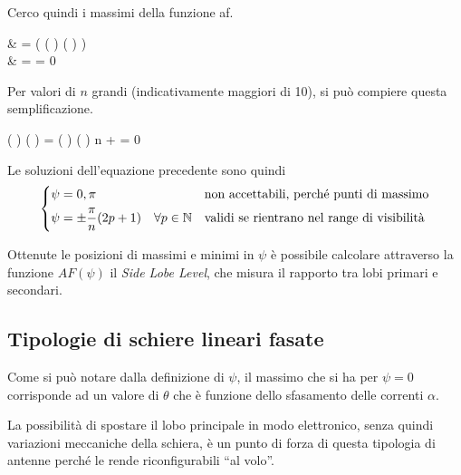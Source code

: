 			Cerco quindi i massimi della funzione \gls{af}.
			
			\begin{esp}
				& = \deriv{}{\psi} \left(
						\frac
							{ \sin(\frac{n}{2} \psi) }
							{ \sin( \frac{\psi}{2} ) }
					\right) \\
				& = \frac{1}{\sin^2 \frac{\psi}{2}} \left[
					\cos \left( \psi \right) \frac{n}{2} \sin\left(  \right) 
					- \sin \left(\frac{n}{2} \psi \right) \cos\left( \frac{\psi}{2} \right)
					\right]
				 = 0
			\end{esp} 
			
			Per valori di $n$ grandi (indicativamente maggiori di 10), si può compiere questa semplificazione.
			
			\begin{esp}
				\cos \left( \psi \right) \sin\left( \frac{\psi}{2} \right)
				=  \sin \left( \psi \right) \cos\left( \frac{\psi}{2} \right)
				 \quad \forall n \to +\infty
				 = 0
			\end{esp} 
			
			Le soluzioni dell'equazione precedente sono quindi
			\begin{equation*}
				\begin{dcases}
					\psi = 0, \pi 
						& \text{non accettabili, perché punti di massimo} \\
					\psi = \pm \frac{\pi}{n} (2p + 1) \quad \forall p \in \mathbb{N}
						& \text{validi se rientrano nel range di visibilità}
				\end{dcases}
			\end{equation*}

			Ottenute le posizioni di massimi e minimi in $\psi$ è possibile calcolare attraverso la funzione $AF(\psi)$ il \emph{Side Lobe Level}, che misura il rapporto tra lobi primari e secondari.

	\subsection{Tipologie di schiere lineari fasate}
		Come si può notare dalla definizione di $\psi$, il massimo che si ha per $\psi = 0$ corrisponde ad un valore di $\theta$ che è funzione dello sfasamento delle correnti $\alpha$.
		
		La possibilità di spostare il lobo principale in modo elettronico, senza quindi variazioni meccaniche della schiera, è un punto di forza di questa tipologia di antenne perché le rende riconfigurabili ``al volo''.
		
